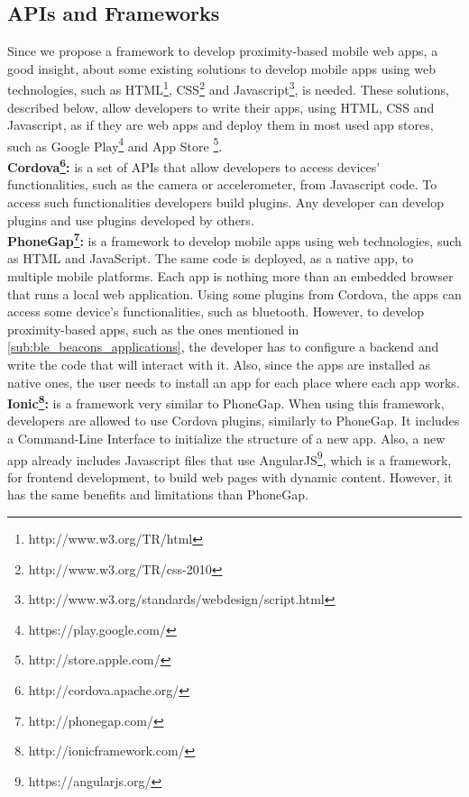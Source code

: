 \subsection{APIs and Frameworks}
\label{sub:frameworks_web}
Since we propose a framework to develop proximity-based
mobile web apps, a good insight, about some existing
solutions to develop mobile apps using web technologies,
such as 
HTML\footnote{http://www.w3.org/TR/html}, 
CSS\footnote{http://www.w3.org/TR/css-2010}
and 
Javascript\footnote{http://www.w3.org/standards/webdesign/script.html}, 
is needed.
These solutions, described below, allow developers to
write their apps, using HTML, CSS and Javascript, as
if they are web apps and deploy them in most used app
stores, such as 
Google Play\footnote{https://play.google.com/}
and
App Store \footnote{http://store.apple.com/}.
\\
\textbf{Cordova\footnote{http://cordova.apache.org/}:}
is a set of APIs that allow developers to access
devices' functionalities, such as the camera or
accelerometer, from Javascript code.
To access such functionalities developers build plugins.
Any developer can develop plugins and use plugins
developed by others.
\\
\textbf{PhoneGap\footnote{http://phonegap.com/}:}
is a framework to develop mobile apps
using web technologies, such as HTML and JavaScript. The
same code is deployed, as a native app, to multiple mobile
platforms. Each app is nothing more than an embedded browser
that runs a local web application. 
Using some plugins from Cordova, the apps can access some
device's functionalities, such as bluetooth. 
However, to develop proximity-based apps, such as
the ones mentioned in 
\ref{sub:ble_beacons_applications},
the developer has to configure a backend and write the
code that will interact with it. Also, since the apps are
installed as native ones, the user needs to install
an app for each place where each app works.
\\
\textbf{Ionic\footnote{http://ionicframework.com/}:}
is a framework very similar to PhoneGap. When using
this framework, developers are allowed to use Cordova
plugins, similarly to PhoneGap. It includes a
Command-Line Interface to initialize the structure
of a new app. Also, a new app already includes Javascript
files that use 
AngularJS\footnote{https://angularjs.org/}, 
which is a framework, for frontend development,
to build web pages with dynamic content.
However, it has the same benefits and limitations
than PhoneGap.

